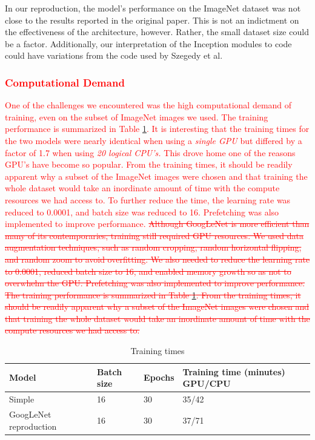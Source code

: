\documentclass{article}
\begin{document}
In our reproduction, the model's performance on the ImageNet dataset was not  close to the results reported in the original paper. This is not an indictment on the effectiveness of the architecture, however. Rather, the small dataset size could be a factor. Additionally, our interpretation of the Inception modules to code could have variations from the code used by Szegedy et al.

\textcolor{red}{\subsubsection{Computational Demand}}
\textcolor{red}{One of the challenges we encountered was the high computational demand of training, even on the subset of ImageNet images we used.  The training performance is summarized in Table \ref{tab:training_times}. It is interesting that the training times for the two models were nearly identical when using a \textit{single GPU} but differed by a factor of 1.7 when using \textit{20 logical CPU's.} This drove home one of the reasons GPU's have become so popular. From the training times, it should be readily apparent why a subset of the ImageNet images were chosen and that training the whole dataset would take an inordinate amount of time with the compute resources we had access to. To further reduce the time, the learning rate was reduced to 0.0001, and batch size was reduced to 16. Prefetching was also implemented to improve performance\cite{tensorflow_data_performance}.} \textcolor{red}{\sout{Although GoogLeNet is more efficient than many of its contemporaries, training still required GPU resources. We used data augmentation techniques, such as random cropping, random horizontal flipping, and random zoom to avoid overfitting\cite{dishasai_multiclass_classification}. We also needed to reduce the learning rate to 0.0001, reduced batch size to 16, and enabled memory growth\cite{tensorflow_memory_growth} so as not to overwhelm the GPU. Prefetching was also implemented to improve performance\cite{tensorflow_data_performance}. The training performance is summarized in Table \ref{tab:training_times}. From the training times, it should be readily apparent why a subset of the ImageNet images were chosen and that training the whole dataset would take an inordinate amount of time with the compute resources we had access to.}}

\begin{table}[ht]
    \centering
    \begin{tabular}{llll}
    \hline
    \textbf{Model} & \textbf{Batch size} & \textbf{Epochs} & \textbf{Training time (minutes) GPU/CPU} \\  \hline
    Simple & 16 & 30 & 35/42 \\ \hline
    GoogLeNet reproduction & 16 & 30 & 37/71 \\ \hline
    \end{tabular}
    \caption{Training times}
    \label{tab:training_times}
\end{table}
\end{document}
